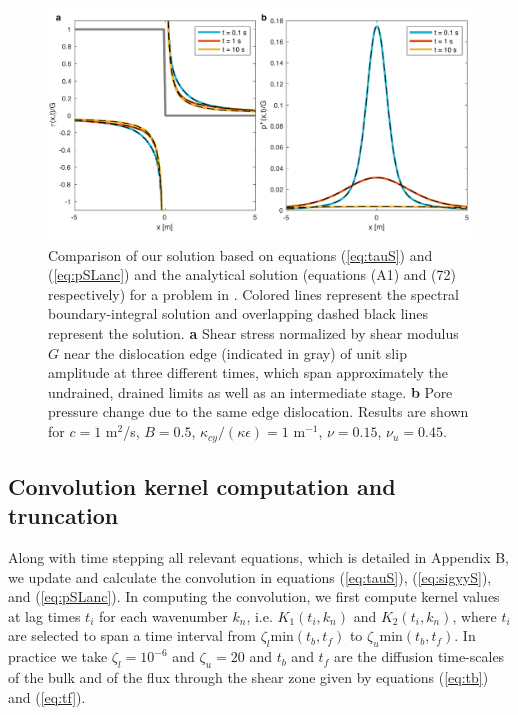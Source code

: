\documentclass[draft]{agujournal2019}
\begin{document}
\begin{figure}[H]
\includegraphics[scale = 0.8]{Figures/Pore_pressure_benchmark_SandR2017.pdf} %
\caption{Comparison of our solution based on equations (\ref{eq:tauS}) and (\ref{eq:pSLanc}) and the analytical solution (equations (A1) and (72) respectively) for a problem in . Colored lines represent the spectral boundary-integral solution and overlapping dashed black lines represent the  solution. \textbf{a} Shear stress normalized by shear modulus $G$ near the dislocation edge (indicated in gray) of unit slip amplitude at three different times, which span approximately the undrained, drained limits as well as an intermediate stage. \textbf{b} Pore pressure change due to the same edge dislocation. Results are shown for $c = 1$ m$^2$/s, $B = 0.5$, $\kappa_{cy}/(\kappa \epsilon) = 1 $ m$^{-1}$, $\nu=0.15$, $\nu_u = 0.45$.}
\label{fig:Song}
\end{figure}






\subsection{Convolution kernel computation and truncation}

Along with time stepping all relevant equations, which is detailed in Appendix B, we update and calculate the convolution in equations (\ref{eq:tauS}), (\ref{eq:sigyyS}), and (\ref{eq:pSLanc}). In computing the convolution, we first compute kernel values at lag times $t_i$ for each wavenumber $k_n$, i.e. $K_1(t_i,k_n)$ and $K_2(t_i,k_n)$, where $t_i$ are selected to span a time interval from $\zeta_l \text{min} (t_b, t_f)$ to $\zeta_u \text{min} (t_b, t_f)$. In practice we take $\zeta_l = 10^{-6}$ and $\zeta_u = 20$ and $t_b$ and $t_f$ are the diffusion time-scales of the bulk and of the flux through the shear zone given by equations (\ref{eq:tb}) and (\ref{eq:tf}).
\end{document}

